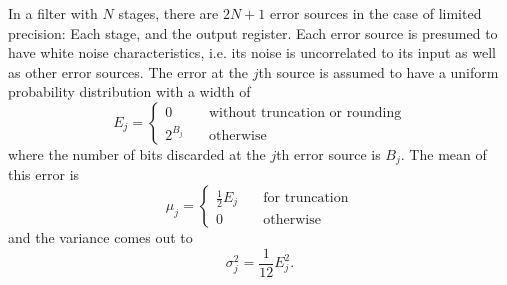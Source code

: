 In a  filter with $N$ stages,  there are $2N+1$  error sources in the  case of
limited precision: Each stage,  and the output register. Each  error source is
presumed to have  white noise characteristics, i.e. its  noise is uncorrelated
to its input as well as other error sources.  The error at the $j$th source is
assumed to have a uniform probability distribution with a width of
\begin{equation}
    \label{eq:cic:truncation_rounding:probability_distribution}
    E_j = \left\lbrace
        \begin{aligned}
            0        & \quad\text{without truncation or rounding}\\
            2^{B_j}  & \quad\text{otherwise}
        \end{aligned}
    \right.
\end{equation}
where the number of bits discarded at the $j$th error source is $B_j$. The mean
of this error is
\begin{equation}
    \label{eq:cic:truncation_rounding:mean}
    \mu_j = \left\lbrace
        \begin{aligned}
            \frac{1}{2}E_j & \quad\text{for truncation}\\
            0              & \quad\text{otherwise}
        \end{aligned}
    \right.
\end{equation}
and the variance comes out to
\begin{equation}
    \label{eq:cic:truncation_rounding:variance}
    \sigma_j^2 = \frac{1}{12}E_j^2.
\end{equation}

